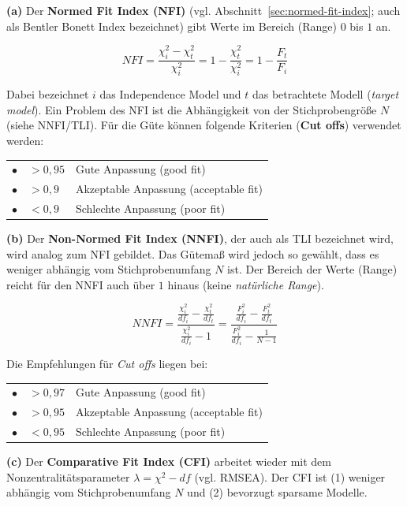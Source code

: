 \documentclass{article}
\numberwithin{equation}{section}
\begin{document}
\textbf{(a)} Der \textbf{Normed Fit Index (NFI)} (vgl. Abschnitt~\ref{sec:normed-fit-index}; auch als Bentler Bonett Index bezeichnet) gibt Werte im Bereich (Range) $0$ bis $1$ an.

\begin{equation}
NFI = \frac{\chi^2_i - \chi^2_t}{\chi^2_i} = 1 - \frac{\chi^2_t}{\chi^2_i} = 1 - \frac{F_t}{F_i}
\end{equation}

Dabei bezeichnet $i$ das Independence Model und $t$ das betrachtete Modell (\emph{target model}). Ein Problem des NFI ist die Abhängigkeit von der Stichprobengröße $N$ (siehe NNFI/TLI). Für die Güte können folgende Kriterien (\textbf{Cut offs}) verwendet werden:

\begin{tabular}{lll}
$\bullet$ & $> 0,95$ & Gute Anpassung (good fit)\\
$\bullet$ & $> 0,9$ & Akzeptable Anpassung (acceptable fit)\\
$\bullet$ & $< 0,9$ & Schlechte Anpassung (poor fit)
\end{tabular}

\textbf{(b)} Der \textbf{Non-Normed Fit Index (NNFI)}, der auch als TLI bezeichnet wird, wird analog zum NFI gebildet. Das Gütemaß wird jedoch so gewählt, dass es weniger abhängig vom Stichprobenumfang $N$ ist. Der Bereich der Werte (Range) reicht für den NNFI auch über $1$ hinaus (keine \emph{natürliche Range}).

\begin{equation}
NNFI = \frac{\frac{\chi^2_i}{df_i} - \frac{\chi^2_t}{df_t}}{\frac{\chi^2_i}{df_i} - 1} = \frac{\frac{F^2_i}{df_i} - \frac{F^2_t}{df_t}}{\frac{F^2_i}{df_i} - \frac{1}{N-1}}
\end{equation}

Die Empfehlungen für \emph{Cut offs} liegen bei:

\begin{tabular}{lll}
$\bullet$ & $> 0,97$ & Gute Anpassung (good fit)\\
$\bullet$ & $> 0,95$ & Akzeptable Anpassung (acceptable fit)\\
$\bullet$ & $< 0,95$ & Schlechte Anpassung (poor fit)
\end{tabular}

\textbf{(c)} Der \textbf{Comparative Fit Index (CFI)} arbeitet wieder mit dem Nonzentralitätsparameter $\lambda = \chi^2 - df$ (vgl. RMSEA). Der CFI ist (1) weniger abhängig vom Stichprobenumfang $N$ und (2) bevorzugt sparsame Modelle.
\end{document}
